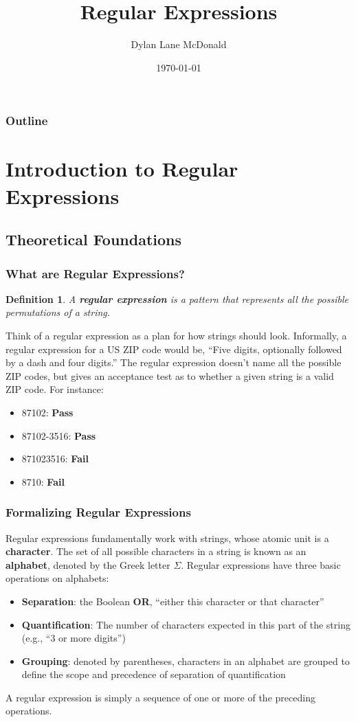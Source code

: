 \documentclass[aspectratio=169]{beamer}
\title{Regular Expressions}
\author{Dylan Lane McDonald}
\institute{CNM STEMulus Center\\Web Development with PHP}
\date{\today}
\newtheorem{defn}{Definition}
\begin{document}
\lstset{language=PHP}
\begin{frame}
\titlepage
\end{frame}

\begin{frame}
\frametitle{Outline}
\tableofcontents
\end{frame}

\section{Introduction to Regular Expressions}
\subsection{Theoretical Foundations}
\begin{frame}
\frametitle{What are Regular Expressions?}
\begin{defn}
A \textbf{regular expression} is a pattern that represents all the possible permutations of a string.
\end{defn}
\pause
Think of a regular expression as a plan for how strings should look. Informally, a regular expression for a US ZIP code would be, ``Five digits, optionally followed by a dash and four digits.'' The regular expression doesn't name all the possible ZIP codes, but gives an acceptance test as to whether a given string is a valid ZIP code. For instance:
\begin{itemize}
	\item 87102: \textbf{Pass}
	\item 87102-3516: \textbf{Pass}
	\item 871023516: \textbf{Fail}
	\item 8710: \textbf{Fail}
\end{itemize}
\end{frame}

\begin{frame}
\frametitle{Formalizing Regular Expressions}
Regular expressions fundamentally work with strings, whose atomic unit is a \textbf{character}. The set of all possible characters in a string is known as an \textbf{alphabet}, denoted by the Greek letter $\Sigma$. Regular expressions have three basic operations on alphabets:
\begin{itemize}
	\item \textbf{Separation}: the Boolean \textbf{OR}, ``either this character or that character''
	\item \textbf{Quantification}: The number of characters expected in this part of the string (e.g., ``3 or more digits'')
	\item \textbf{Grouping}: denoted by parentheses, characters in an alphabet are grouped to define the scope and precedence of separation of quantification
\end{itemize}
A regular expression is simply a sequence of one or more of the preceding operations.
\end{frame}
\end{document}
